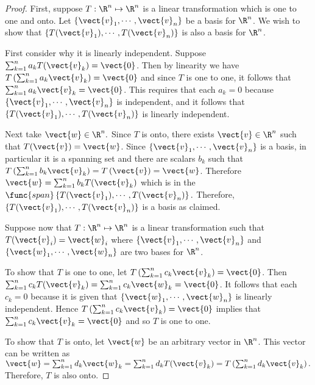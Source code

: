 \begin{proof}
First, suppose $T:\R^n \mapsto \R^n$ is a linear
transformation which is one to one and onto. Let $\left\{
\vect{v}_{1},\cdots ,\vect{v}_{n}\right\} $ be a basis for
$\R^n$. We wish to show that $\left\{ T(\vect{v}_{1}),\cdots ,
T(\vect{v}_{n})\right\} $ is also a basis for $\R^n$. 

First consider why it is linearly independent. Suppose
$\sum_{k=1}^{n}a_{k}T(\vect{v}_{k})=\vect{0}$. Then by linearity we have $T\left(
\sum_{k=1}^{n}a_{k}\vect{v}_{k}\right) =\vect{0}$ and since $T$ is one
to one, it follows that $\sum_{k=1}^{n}a_{k}\vect{v}_{k}=\vect{0}$.
This requires that  each $a_{k}=0$ because $\left\{ \vect{v}_{1},\cdots,
\vect{v}_{n}\right\} $ is independent, and it follows that $\left\{
T(\vect{v}_{1}),\cdots , T(\vect{v}_{n})\right\} $ is linearly
independent. 


Next take $\vect{w}\in \R^n.$ Since $T$ is onto,
there exists $\vect{v}\in \R^n$ such that
$T(\vect{v})=\vect{w}$. Since $ \left\{ \vect{v}_{1},\cdots
,\vect{v}_{n}\right\} $ is a basis, in particular it is a spanning set
and there are scalars $b_{k}$ such that $T\left(
\sum_{k=1}^{n}b_{k}\vect{v} _{k}\right) =T\left( \vect{v}\right)
=\vect{w}$. Therefore $\vect{w} =\sum_{k=1}^{n}b_{k}T(\vect{v}_{k})$
which is in the $\func{span}\left\{ T(\vect{v}_{1}),\cdots ,
T(\vect{v}_{n})\right\} .$ Therefore, $\left\{ T(\vect{v}_{1}),\cdots
,T(\vect{v}_{n}) \right\} $ is a basis as claimed.

Suppose now that $T: \R^n \mapsto \R^n$ is a linear
transformation such that $T(\vect{v}_{i})=\vect{w}_{i}$ where
$\left\{\vect{v} _{1},\cdots ,\vect{v}_{n}\right\} $ and $\left\{
\vect{w}_{1},\cdots , \vect{w}_{n}\right\} $ are two bases for
$\R^n$. 

To show that $T$ is one to one, let $T\left(
\sum_{k=1}^{n}c_{k}\vect{v}_{k}\right) =\vect{0}$. Then
$\sum_{k=1}^{n}c_{k}T(\vect{v}_{k})=\sum_{k=1}^{n}c_{k}\vect{w}_{k}=\vect{
0}$. It follows that each $c_{k} = 0$ because it is given that
$\left\{ \vect{w} _{1},\cdots ,\vect{w}_{n}\right\} $ is linearly
independent. Hence $T\left( \sum_{k=1}^{n}c_{k}\vect{v}_{k}\right)
=\vect{0}$ implies that $\sum_{k=1}^{n}c_{k}\vect{v}_{k}=\vect{0}$ and
so $T$ is one to one.  

To show that $T$ is onto, let $\vect{w}$ be an arbitrary vector in
$\R^n$. This vector can be written as $\vect{w} =
\sum_{k=1}^{n}d_k\vect{w}_k =
\sum_{k=1}^{n}d_{k}T(\vect{v}_{k})=T\left( \sum_{k=1}^{n}d_{k}
\vect{v}_{k}\right) .$  Therefore, $T$ is also onto. 
\end{proof}

